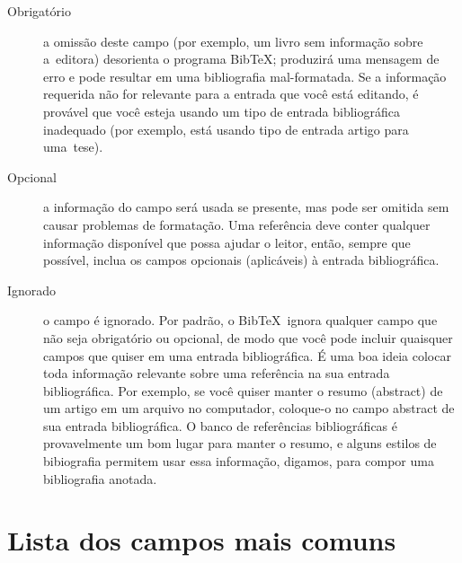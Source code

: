 \documentclass[article,openany]{memoir}
\begin{document}
\begin{description}
\item[Obrigatório]
a omissão deste campo (por exemplo, um livro sem informação sobre
a~editora) desorienta o programa Bib\TeX; produzirá uma mensagem de
erro e pode resultar em uma bibliografia mal-formatada. Se a
informação requerida não for relevante para a entrada que você está
editando, é provável que você esteja usando um tipo de entrada
bibliográfica inadequado (por exemplo, está usando tipo de entrada
artigo para uma~tese).


\item[Opcional]
a informação do campo será usada se presente, mas pode ser omitida sem
causar problemas de formatação. Uma referência deve conter qualquer
informação disponível que possa ajudar o leitor, então, sempre que
possível, inclua os campos opcionais (aplicáveis) à entrada
bibliográfica.


\item[Ignorado] o campo é ignorado. Por padrão, o Bib\TeX\ ignora qualquer
campo que não seja obrigatório ou opcional, de modo que você pode
incluir quaisquer campos que quiser em uma entrada bibliográfica. É
uma boa ideia colocar toda informação relevante sobre uma referência
na sua entrada bibliográfica. Por exemplo, se você quiser manter o
resumo (abstract) de um artigo em um arquivo no computador, coloque-o
no campo abstract de sua entrada bibliográfica. O banco de referências
bibliográficas é provavelmente um bom lugar para manter o resumo, e
alguns estilos de bibiografia permitem usar essa informação, digamos,
para compor uma bibliografia anotada.
\end{description}

\section{Lista dos campos mais comuns}
\end{document}
